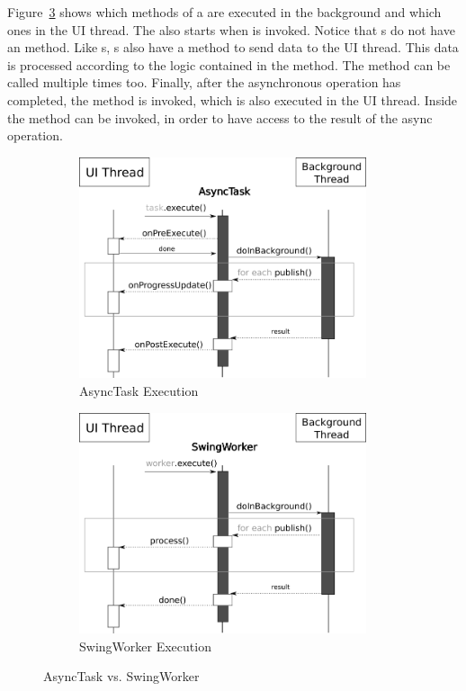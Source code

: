 \documentclass[type=bsc,accentcolor=tud9c]{tudthesis}
\begin{document}
Figure~\ref{fig:swingWorker-execution} shows which methods of a  are executed in the background and which ones in the UI thread. The  also starts when  is invoked. Notice that s do not have an  method. Like s, s also have a  method to send data to the UI thread. This data is processed according to the logic contained in the  method. The  method can be called multiple times too. Finally, after the asynchronous operation has completed, the method  is invoked, which is also executed in the UI thread. Inside  the method  can be invoked, in order to have access to the result of the async operation.

\begin{figure}[h]
\begin{subfigure}{0.5\textwidth}
\begin{center}
\includegraphics[height=6.5cm]{async-constructs/asynctask.png}
\end{center}
\caption{AsyncTask Execution}
\label{fig:asynctask-execution}
\end{subfigure}
\begin{subfigure}{0.5\textwidth}
\begin{center}
\includegraphics[height=6.5cm]{async-constructs/swingworker.png}
\end{center}
\caption{SwingWorker Execution}
\label{fig:swingWorker-execution}
\end{subfigure}
\caption{AsyncTask vs. SwingWorker}
\end{figure}
\end{document}

